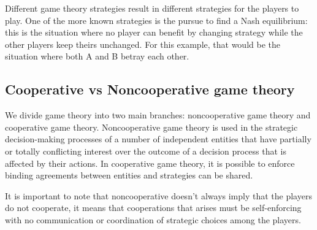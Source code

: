 Different game theory strategies result in different strategies for the players to play. One of the more known strategies is the pursue to find a Nash equilibrium: 
this is the situation where no player can benefit by changing strategy while the other players keep theirs unchanged. For this example, that would be the situation where both A and B betray each other.    

\subsection{Cooperative vs Noncooperative game theory}
We divide game theory into two main branches: noncooperative game theory and cooperative game theory. Noncooperative game theory is used in the strategic decision-making processes of a number of independent entities that have partially or totally conflicting interest over the outcome of a decision process that is affected by their actions.  In cooperative game theory, it is possible to enforce binding agreements between entities and strategies can be shared. 

It is important to note that noncooperative doesn't always imply that the players do not cooperate, it means that cooperations that arises must be self-enforcing with no communication or coordination of strategic choices among the players.   
